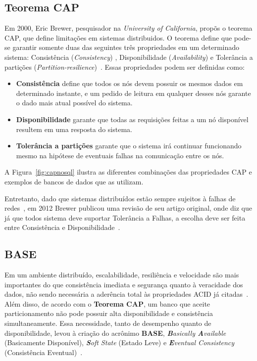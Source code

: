 \subsection{Teorema CAP}
\label{sec:cap}
Em 2000, Eric Brewer, pesquisador na \emph{University of California}, propõs o teorema CAP, que define limitações em sistemas distribuidos. O teorema define que pode-se garantir somente duas das seguintes três propriedades em um determinado sistema: Consistência (\emph{Consistency}) , Disponibilidade (\emph{Availability}) e Tolerância a partições (\emph{Partition-resilience})~\cite{brewer}. Essas propriedades podem ser definidas como:
\begin{itemize}
	\item \textbf{Consistência} define que todos os nós devem possuir os mesmos dados em determinado instante, e um pedido de leitura em qualquer desses nós garante o dado mais atual possível do sistema.
	\item \textbf{Disponibilidade} garante que todas as requisições feitas a um nó disponível resultem em uma resposta do sistema.
	\item \textbf{Tolerância a partições} garante que o sistema irá continuar funcionando mesmo na hipótese de eventuais falhas na comunicação entre os nós.
\end{itemize}

A Figura~\ref{fig:capnosql} ilustra as diferentes combinações das propriedades CAP e exemplos de bancos de dados que as utilizam.

Entretanto, dado que sistemas distribuídos estão sempre sujeitos à falhas de redes~\cite{deutsch}, em 2012 Brewer publicou uma revisão de seu artigo original, onde diz que já que todos sistema deve suportar Tolerância a Falhas, a escolha deve ser feita entre Consistência e Disponibilidade~\cite{brewer12years}.



\subsection{BASE}
Em um ambiente distribuído, escalabilidade, resiliência e velocidade são mais importantes do que consistência imediata e segurança quanto à veracidade dos  dados, não sendo necessária a aderência total às propriedades ACID já citadas~\cite{neo4j_acidbase}. Além disso, de acordo com o \textbf{Teorema CAP}, um banco que aceite particionamento não pode possuir alta disponibilidade e consistência simultaneamente. Essa necessidade, tanto de desempenho quanto de disponibilidade, levou à criação do acrônimo \textbf{BASE}, \emph{\textbf{B}asically \textbf{A}vailable} (Basicamente Disponível), \emph{\textbf{S}oft State} (Estado Leve) e \emph{\textbf{E}ventual Consistency} (Consistência Eventual)~\cite{foxcluster}. 

